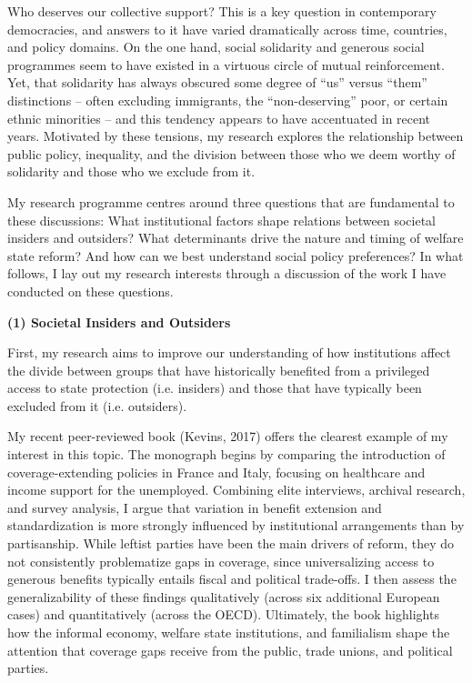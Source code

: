 \documentclass[letterpaper]{scrartcl}
\begin{document}
  Who deserves our collective support? This is a key question in contemporary democracies, and answers to it have varied dramatically across time, countries, and policy domains. On the one hand, social solidarity and generous social programmes seem to have existed in a virtuous circle of mutual reinforcement. Yet, that solidarity has always obscured some degree of ``us'' versus ``them'' distinctions -- often excluding immigrants, the ``non-deserving'' poor, or certain ethnic minorities -- and this tendency appears to have accentuated in recent years. Motivated by these tensions, my research explores the relationship between public policy, inequality, and the division between those who we deem worthy of solidarity and those who we exclude from it.

  My research programme centres around three questions that are fundamental to these discussions: What institutional factors shape relations between societal insiders and outsiders? What determinants drive the nature and timing of welfare state reform? And how can we best understand social policy preferences? In what follows, I lay out my research interests through a discussion of the work I have conducted on these questions.

  \textbf{(1) Societal Insiders and Outsiders}
  \vspace{-1em}

  First, my research aims to improve our understanding of how institutions affect the divide between groups that have historically benefited from a privileged access to state protection (i.e. insiders) and those that have typically been excluded from it (i.e. outsiders).

  My recent peer-reviewed book (Kevins, 2017) offers the clearest example of my interest in this topic. The monograph begins by comparing the introduction of coverage-extending policies in France and Italy, focusing on healthcare and income support for the unemployed. Combining elite interviews, archival research, and survey analysis, I argue that variation in benefit extension and standardization is more strongly influenced by institutional arrangements than by partisanship. While leftist parties have been the main drivers of reform, they do not consistently problematize gaps in coverage, since universalizing access to generous benefits typically entails fiscal and political trade-offs. I then assess the generalizability of these findings qualitatively (across six additional European cases) and quantitatively (across the OECD). Ultimately, the book highlights how the informal economy, welfare state institutions, and familialism shape the attention that coverage gaps receive from the public, trade unions, and political parties.
\end{document}
